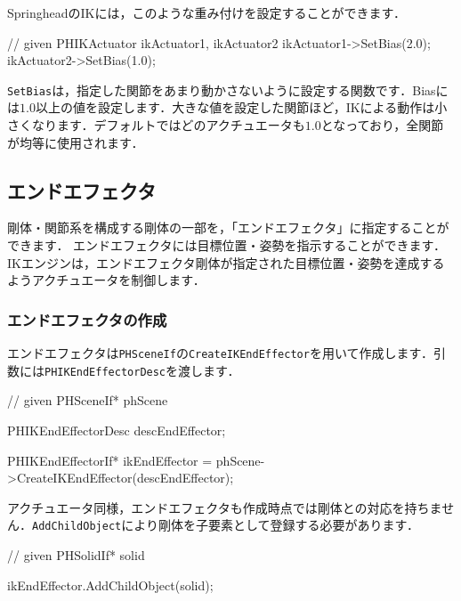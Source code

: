 SpringheadのIKには，このような重み付けを設定することができます．
\begin{sourcecode}
// given PHIKActuator ikActuator1, ikActuator2
ikActuator1->SetBias(2.0);
ikActuator2->SetBias(1.0);
\end{sourcecode}
\texttt{SetBias}は，指定した関節をあまり動かさないように設定する関数です．Biasには$1.0$以上の値を設定します．大きな値を設定した関節ほど，IKによる動作は小さくなります．デフォルトではどのアクチュエータも$1.0$となっており，全関節が均等に使用されます．

\KLUDGE %
\KLUDGE %





\KLUDGE %
\subsection*{エンドエフェクタ}
\KLUDGE %

\KLUDGE 剛体・関節系を構成する剛体の一部を，「エンドエフェクタ」に指定することができます．
\KLUDGE エンドエフェクタには目標位置・姿勢を指示することができます．IKエンジンは，エンドエフェクタ剛体が指定された目標位置・姿勢を達成するようアクチュエータを制御します．


\KLUDGE %
\KLUDGE %
\subsubsection*{エンドエフェクタの作成}

\KLUDGE エンドエフェクタは\texttt{PHSceneIf}の\texttt{CreateIKEndEffector}を用いて作成します．引数には\texttt{PHIKEndEffectorDesc}を渡します．
\begin{sourcecode}
// given PHSceneIf* phScene

PHIKEndEffectorDesc descEndEffector;

PHIKEndEffectorIf* ikEndEffector
  = phScene->CreateIKEndEffector(descEndEffector);
\end{sourcecode}

\KLUDGE アクチュエータ同様，エンドエフェクタも作成時点では剛体との対応を持ちません．\texttt{AddChildObject}により剛体を子要素として登録する必要があります．
\begin{sourcecode}
// given PHSolidIf* solid

ikEndEffector.AddChildObject(solid);
\end{sourcecode}

